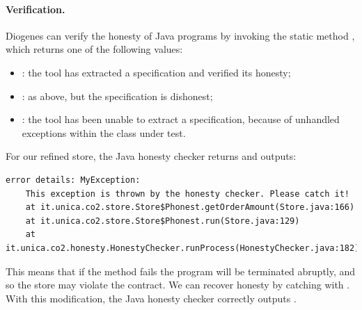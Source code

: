 \paragraph{Verification.}
Diogenes can verify the honesty of Java programs 
by invoking the static method
,
which returns one of the following values:
\begin{itemize}[noitemsep,topsep=0pt]
\item {}: the tool has extracted a \coco specification and verified its honesty;
\item {}: as above, but the \coco specification is dishonest;
\item {}: the tool has been unable to extract a \coco specification,
  \eg because of unhandled exceptions within the class under test.
\end{itemize}

\noindent
For our refined store, the Java honesty checker returns  and outputs:
\begin{mdframed}
  \begin{verbatim}
error details: MyException: 
    This exception is thrown by the honesty checker. Please catch it!
    at it.unica.co2.store.Store$Phonest.getOrderAmount(Store.java:166)
    at it.unica.co2.store.Store$Phonest.run(Store.java:129)
    at it.unica.co2.honesty.HonestyChecker.runProcess(HonestyChecker.java:182)
  \end{verbatim}
\end{mdframed}
This means that if the method  fails
the program will be terminated abruptly, and so the store may violate the contract.
We can recover honesty by catching  with .
With this modification, the Java honesty checker correctly outputs .

